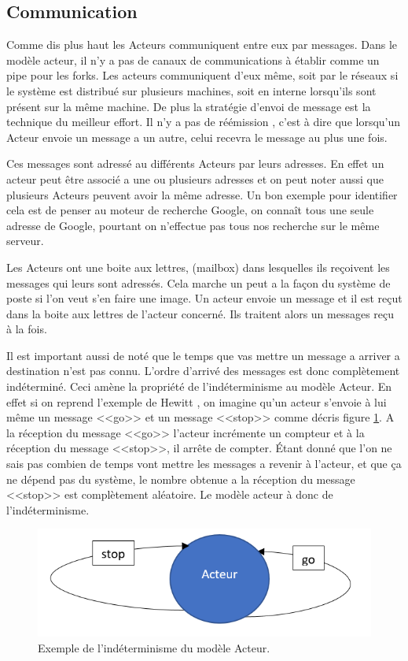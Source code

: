 \documentclass[11pt, a4paper]{article}
\begin{document}
\subsection{Communication}

Comme dis plus haut les Acteurs communiquent entre eux par messages. Dans le modèle acteur, il n'y a pas de canaux de communications à établir comme un pipe pour les forks. Les acteurs communiquent d'eux même, soit par le réseaux si le système est distribué sur plusieurs machines, soit en interne lorsqu'ils sont présent sur la même machine. De plus la stratégie d'envoi de message est la technique du meilleur effort. Il n'y a pas de réémission , c'est à dire que lorsqu'un Acteur envoie un message a un autre, celui recevra le message au plus une fois. 
\par Ces messages sont adressé au différents Acteurs par leurs adresses. En effet un acteur peut être associé a une ou plusieurs adresses et on peut noter aussi que plusieurs Acteurs peuvent avoir la même adresse. Un bon exemple pour identifier cela est de penser au moteur de recherche Google, on connaît tous une seule adresse de Google, pourtant on n'effectue pas tous nos recherche sur le même serveur.
\par Les Acteurs ont une boite aux lettres, (mailbox) dans lesquelles ils reçoivent les messages qui leurs sont adressés. Cela marche un peut a la façon du système de poste si l'on veut s'en faire une image. Un acteur envoie un message et il est reçut dans la boite aux lettres de l'acteur concerné. Ils traitent alors un messages reçu à la fois.
\par Il est important aussi de noté que le temps que vas mettre un message a arriver a destination n'est pas connu. L'ordre d'arrivé des messages est donc complètement indéterminé. Ceci amène la propriété de l'indéterminisme au modèle Acteur. En effet si on reprend l'exemple de Hewitt \cite{video_hewitt}, on imagine qu'un acteur s'envoie à lui même un message <<go>> et un message <<stop>> comme décris figure \ref{fig1}. A la réception du message <<go>> l'acteur incrémente un compteur et à la réception du message <<stop>>, il arrête de compter. Étant donné que l'on ne sais pas combien de temps vont mettre les messages a revenir à l'acteur, et que ça ne dépend pas du système, le nombre obtenue a la réception du message <<stop>> est complètement aléatoire. Le modèle acteur à donc de l'indéterminisme.

\begin{figure}
\center
\includegraphics[scale=0.5]{actor_underminisism}
\caption{Exemple de l'indéterminisme du modèle Acteur.}
\label{fig1}
\end{figure}
\end{document}
